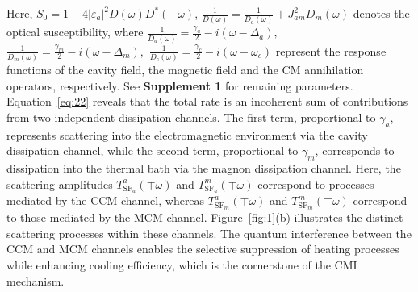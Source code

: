 \documentclass[aps, prresearch, reprint, nofootinbib, longbibliography]{revtex4-2}
\begin{document}
Here, $S_0=1 - 4|\varepsilon_a|^2 D(\omega) D^*(-\omega)$,
$
\frac{1}{D(\omega)} = \frac{1}{D_a(\omega)} + J_{am}^2 D_m(\omega)
$
denotes the optical susceptibility,
where
$
\frac{1}{D_a(\omega)} = \frac{\gamma_a}{2} -i(\omega-\Delta_a ),$
$	\frac{1}{D_m(\omega)} = \frac{\gamma_m}{2} -i(\omega-\Delta_m ),$
$\frac{1}{D_c(\omega)} = \frac{\gamma_c}{2} -i(\omega-\omega_c )
$
represent the response functions of the cavity field, the magnetic field and the CM annihilation operators, respectively. See \textbf{Supplement 1} for remaining parameters.
Equation~\eqref{eq:22} reveals that the total rate is an incoherent sum of contributions from two independent dissipation channels.
The first term, proportional to $\gamma_a$, represents scattering into the  electromagnetic environment via the cavity dissipation channel, while the second term, proportional to $\gamma_m$, corresponds to dissipation into the thermal bath via the magnon dissipation channel.
Here, the scattering amplitudes $T^{a}_{\mathrm{SF}_a}(\mp\omega)$ and $T^{m}_{\mathrm{SF}_a}(\mp\omega)$ correspond to processes mediated by the CCM channel, whereas $T^{a}_{\mathrm{SF}_m}(\mp\omega)$  and $T^{m}_{\mathrm{SF}_m}(\mp\omega)$ correspond to those mediated  by the MCM channel.
Figure~\ref{fig:1}(b) illustrates the distinct scattering processes within these channels.
The quantum interference between the CCM and MCM channels enables the selective suppression of heating processes while enhancing cooling efficiency, which is the cornerstone of the CMI mechanism.
\end{document}
